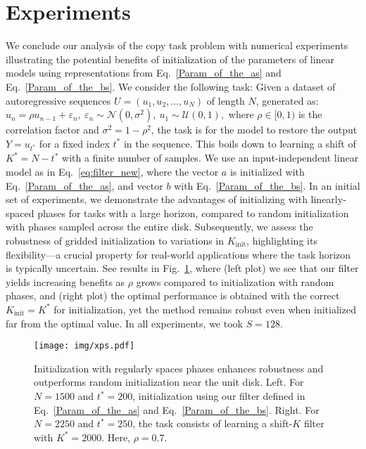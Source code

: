 \section{Experiments}

We conclude our analysis of the copy task problem with numerical experiments illustrating the potential benefits of initialization of the parameters of linear models using representations from Eq.~\eqref{Param_of_the_as} and Eq.~\eqref{Param_of_the_bs}. We consider the following task: Given a dataset of autoregressive sequences $U = (u_1, u_2, \dots, u_N)$ of length $N$, generated as: \(u_n = \rho u_{n-1} + \varepsilon_n, \  \varepsilon_n \sim \mathcal{N}(0, \sigma^2), \ u_1 \sim \mathcal{U}(0,1),\) where $\rho \in [0,1)$ is the correlation factor and $\sigma^2 = 1 - \rho^2$, the task is for the model to restore the output \(Y = u_{t^*}\) for a fixed index $t^*$ in the sequence. This boils down to learning a shift of $K^* = N-t^*$ with a finite number of samples. We use an input-independent linear model as in Eq.~\eqref{eq:filter_new}, where the vector $a$ is initialized with Eq.~\eqref{Param_of_the_as}, and vector $b$ with Eq.~\eqref{Param_of_the_bs}. In an initial set of experiments, we demonstrate the advantages of initializing with linearly-spaced phases for tasks with a large horizon, compared to random initialization with phases sampled across the entire disk. Subsequently, we assess the robustness of gridded initialization to variations in $K_\text{init}$, highlighting its flexibility—a crucial property for real-world applications where the task horizon is typically uncertain. See results in Fig.~\ref{fig:xps}, where (left plot) we see that our filter yields increasing benefits as $\rho$ grows compared to initialization with random phases, and (right plot) the optimal performance is obtained with the correct $K_\text{init} = K^*$ for initialization, yet the method remains robust even when initialized far from the optimal value. In all experiments, we took $S=128$.
 \begin{figure}[h]
     \centering
     \begin{minipage}{0.55\linewidth}
         \centering
        \texttt{[image: img/xps.pdf]}
     \end{minipage}
     \hspace{1cm}
     \begin{minipage}{0.35\linewidth}
         \vspace{0pt}
         \caption{{Initialization with regularly spaces phases enhances robustness and outperforms random initialization near the unit disk.}  
        {Left.} For $N=1500$ and $t^* = 200$, initialization using our filter defined in Eq.~\eqref{Param_of_the_as}  and Eq.~\eqref{Param_of_the_bs}.
        {Right.} For $N=2250$ and $t^*=250$, the task consists of learning a shift-$K$ filter with $K^*=2000$. Here, $\rho = 0.7$.  }
         \label{fig:xps}
         \vspace{0pt}
     \end{minipage}
 \end{figure}